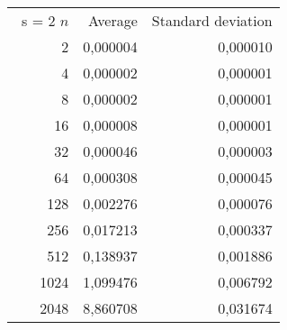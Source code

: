 \begin{tabular}{rrr}\
s = 2
 $n$ & Average & Standard deviation  \\
2 &  0,000004 &  0,000010 \\ 
4 &  0,000002 &  0,000001 \\ 
8 &  0,000002 &  0,000001 \\ 
16 &  0,000008 &  0,000001 \\ 
32 &  0,000046 &  0,000003 \\ 
64 &  0,000308 &  0,000045 \\ 
128 &  0,002276 &  0,000076 \\ 
256 &  0,017213 &  0,000337 \\ 
512 &  0,138937 &  0,001886 \\ 
1024 &  1,099476 &  0,006792 \\ 
2048 &  8,860708 &  0,031674 \\ 
\end{tabular}
